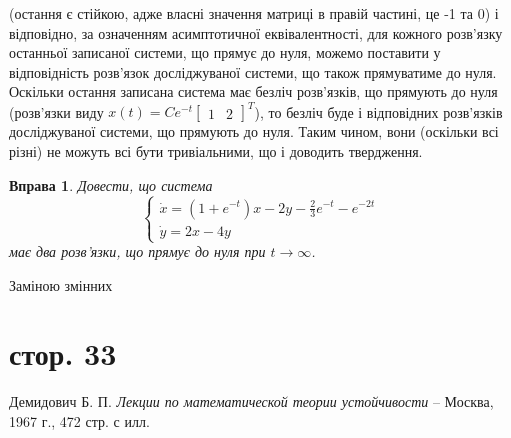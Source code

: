 \documentclass[12pt]{article} %
\newtheorem{prob}{Вправа}
\begin{document}
(остання є стійкою, адже власні значення матриці в правій частині, це -1 та 0) і відповідно, за означенням асимптотичної 
еквівалентності, для кожного розв’язку останньої записаної системи, що прямує до нуля, можемо поставити у відповідність розв’язок
досліджуваної системи, що також прямуватиме до нуля. Оскільки остання записана система має безліч розв’язків, що прямують до нуля
(розв’язки виду $x(t)=Ce^{-t}\begin{bmatrix}1&2\end{bmatrix}^T$), то безліч буде і відповідних розв’язків досліджуваної системи, що
прямують до нуля. Таким чином, вони (оскільки всі різні) не можуть всі бути тривіальними, що і доводить твердження.
\begin{prob}Довести, що система
\[\begin{cases}\dot{x}=(1+e^{-t})x-2y-\frac{2}{3}e^{-t}-e^{-2t}\\\dot{y}=2x-4y\end{cases}\]
має два розв’язки, що прямує до нуля при $t\to\infty$.
\end{prob}
Заміною змінних 
\section{стор. 33}
\begin{thebibliography}{9}
Демидович Б. П. \emph{Лекции по математической теории устойчивости} --
Москва, 1967 г., 472 стр. с илл.
\end{thebibliography}
\end{document}
